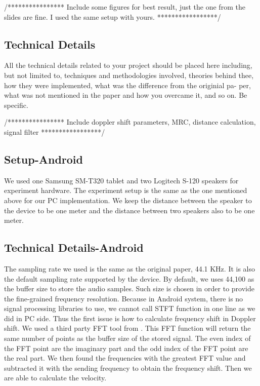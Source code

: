\documentclass{acm_proc_article-sp}
\begin{document}
/****************
Include some figures for best result, just the one from
the slides are fine. I used the same setup with yours.
*****************/

\subsection{Technical Details} \label{technical_details}
All  the  technical  details  related  to  your  project  should  be
placed  here  including,  but  not  limited  to,  techniques  and
methodologies involved, theories behind thee, how they were
implemented, what was the difference from the originial pa-
per,  what  was  not  mentioned  in  the  paper  and  how  you
overcame it, and so on.  Be specific.

/****************
Include doppler shift parameters, MRC, distance calculation, signal filter
*****************/


\subsection{Setup-Android}
We used one Samsung SM-T320 tablet and two Logitech S-120 speakers for experiment 
hardware. The experiment setup is the same as the one mentioned above for our PC 
implementation. We keep the distance between the speaker to the device to be one meter
and the distance between two speakers also to be one meter. 

\subsection{Technical Details-Android}
The sampling rate we used is the same as the original paper, 44.1 KHz. It is also the 
default sampling rate supported by the device. By default, we uses 44,100 as the buffer
size to store the audio samples. Such size is chosen in order to provide the fine-grained
frequency resolution.
Because in Android system, there is no signal processing libraries to use, we cannot 
call STFT function in one line as we did in PC side. Thus the first issue is how to 
calculate frequency shift in Doppler shift. We used a third party FFT tool from 
\cite{FFT}. This FFT function will return the same number of points as the buffer size
of the stored signal. The even index of the FFT point are the imaginary part and the odd 
index of the FFT point are the real part. We then found the frequencies with the greatest
FFT value and subtracted it with the sending frequency to obtain the frequency shift. 
Then we are able to calculate the velocity. 
\end{document}
